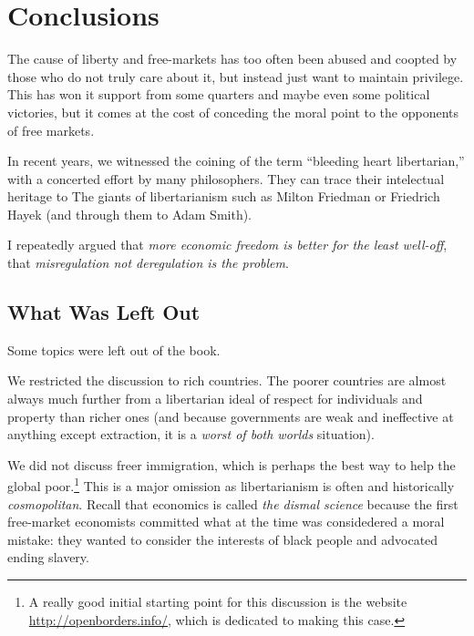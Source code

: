 \chapter{Conclusions}

The cause of liberty and free-markets has too often been abused and coopted by
those who do not truly care about it, but instead just want to maintain
privilege. This has won it support from some quarters and maybe even some
political victories, but it comes at the cost of conceding the moral point to
the opponents of free markets.

In recent years, we witnessed the coining of the term ``bleeding heart
libertarian,'' with a concerted effort by many philosophers. They can trace
their intelectual heritage to The giants of libertarianism such as Milton
Friedman or Friedrich Hayek (and through them to Adam Smith).

I repeatedly argued that \emph{more economic freedom is better for the least
well-off}, that \emph{misregulation not deregulation is the problem}.

\section{What Was Left Out}

Some topics were left out of the book.

We restricted the discussion to rich countries. The poorer countries are almost
always much further from a libertarian ideal of respect for individuals and
property than richer ones (and because governments are weak and ineffective at
anything except extraction, it is a \emph{worst of both worlds} situation).

We did not discuss freer immigration, which is perhaps the best way to help the
global poor.\footnote{A really good initial starting point for this discussion
is the website \url{http://openborders.info/}, which is dedicated to making
this case.} This is a major omission as libertarianism is often and
historically \emph{cosmopolitan}. Recall that economics is called \emph{the
dismal science} because the first free-market economists committed what at the
time was considedered a moral mistake: they wanted to consider the interests of
black people and advocated ending slavery.

